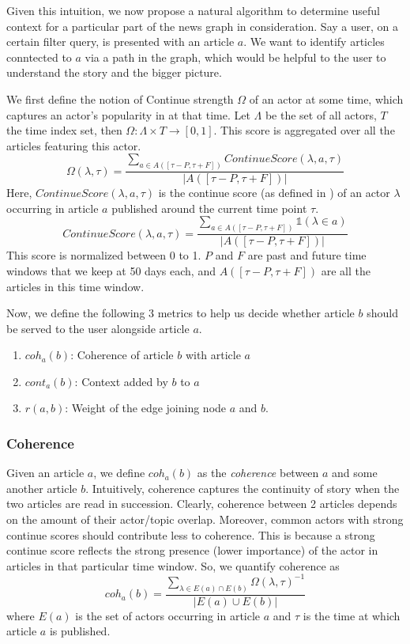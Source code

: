 Given this intuition, we now propose a natural algorithm to determine useful context for a particular part of
the news graph in consideration. Say a user, on a certain filter query, is presented with an article $a$. We want to identify articles
conntected to $a$ via a path in the graph, which would be helpful to the user to understand the story and the bigger picture.

We first define the notion of Continue strength $\Omega$ of an actor at some time, which captures an actor's popularity in at that time.
Let $\Lambda$ be the set of all actors, $T$ the time index set, then $\Omega : \Lambda \times T \rightarrow [0,1]$. This score is aggregated over all the articles featuring this actor.
\begin{equation}
\Omega(\lambda, \tau) = \frac{\sum_{a \in A([\tau - P, \tau + F])}{ContinueScore(\lambda, a, \tau)}}{|A([\tau - P, \tau + F])|}
\end{equation}
Here, $ContinueScore(\lambda, a, \tau)$ is the continue score (as defined in \cite{choudhary@ecir2008}) of an actor $\lambda$ occurring in article $a$ published around the current time point $\tau$. 
\begin{equation}
ContinueScore(\lambda, a, \tau) = \frac{\sum_{a \in A([\tau - P, \tau + F])}\mathbb{1}(\lambda \in a)}{|A([\tau - P, \tau + F])|}
\end{equation}
This score is normalized between 0 to 1. $P$ and $F$ are past and future time windows that we keep at 50 days each, and $A([\tau - P, \tau + F])$ are all the articles in this time window.

Now, we define the following 3 metrics to help us decide whether article $b$ should be served to the user alongside article $a$.
\begin{enumerate}
\item $coh_a(b)$: Coherence of article $b$ with article $a$
\item $cont_a(b)$: Context added by $b$ to $a$ 
\item $r(a, b)$: Weight of the edge joining node $a$ and $b$.
\end{enumerate}

\subsubsection*{Coherence}
Given an article $a$, we define $coh_{a}(b)$ as the \emph{coherence} between $a$ and some another article $b$. Intuitively, coherence captures the continuity of story when the two articles are read in succession.
Clearly, coherence between 2 articles depends on the amount of their actor/topic overlap. Moreover, common actors with strong continue scores should contribute less to coherence. This is because a strong continue score reflects the strong presence (lower importance) of the actor in articles in that particular time window. So, we quantify coherence as
\begin{equation}
coh_{a}(b) = \frac{\sum_{\lambda \in E(a) \cap E(b)}{\Omega(\lambda, \tau)^{-1}}}{|E(a) \cup E(b)|}
\end{equation}
where $E(a)$ is the set of actors occurring in article $a$ and $\tau$ is the time at which article $a$ is published. 

